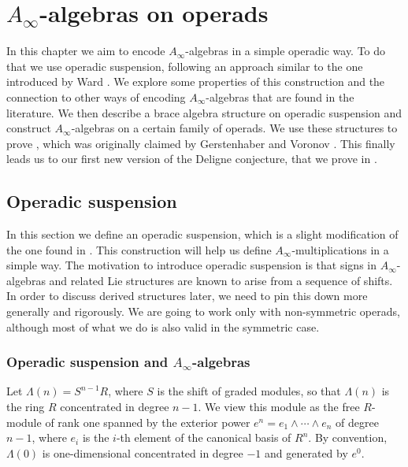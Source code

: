 \documentclass[Thesis.tex]{subfiles}
\begin{document}
\chapter{$A_\infty$-algebras on operads}\label{Sec2}

In this chapter we aim to encode $A_\infty$-algebras in a simple operadic way. To do that we use operadic suspension, following an approach similar to the one introduced by Ward \cite{ward}. We explore some properties of this construction and the connection to other ways of encoding $A_\infty$-algebras that are found in the literature. We then describe a brace algebra structure on operadic suspension and construct $A_\infty$-algebras on a certain family of operads. We use these structures to prove , which was originally claimed by Gerstenhaber and Voronov \cite{GV}. This finally leads us to our first new version of the Deligne conjecture, that we prove in .

\section{Operadic suspension}

In this section we define an operadic suspension, which is a slight modification of the one found in \cite{ward}. This construction will help us define $A_\infty$-multiplications in a simple way. The motivation to introduce operadic suspension is that signs in $A_\infty$-algebras and related Lie structures are known to arise from a sequence of shifts. In order to discuss derived structures later, we need to pin this down more generally and rigorously. We are going to work only with non-symmetric operads, although most of what we do is also valid in the symmetric case.

\subsection{Operadic suspension and $A_\infty$-algebras}\label{lambda}
Let $\Lambda(n)=S^{n-1}R$, where $S$ is the shift of graded modules, so that $\Lambda(n)$ is the ring $R$ concentrated in degree $n-1$. We view this module as the free $R$-module of rank one spanned by the exterior power $e^n=e_1\land\cdots\land e_n$ of degree $n-1$, where $e_i$ is the $i$-th element of the canonical basis of $R^n$. By convention, $\Lambda(0)$ is one-dimensional concentrated in degree $-1$ and generated by $e^0$.
\end{document}
